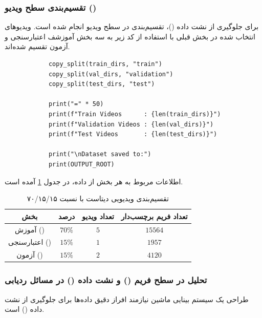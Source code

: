\documentclass{article}
\begin{document}
\subsubsection{تقسیم‌بندی سطح ویدیو ()}

برای جلوگیری از نشت داده ()، تقسیم‌بندی در سطح ویدیو انجام شده است. ویدیوهای انتخاب شده در بخش قبلی با استفاده از کد زیر به سه بخش آموزشف اعتبارسنجی و آزمون تقسیم شده‌اند.

\begin{latin}
	\begin{LTR}
		\begin{verbatim}
			copy_split(train_dirs, "train")
			copy_split(val_dirs, "validation")
			copy_split(test_dirs, "test")
			
			print("=" * 50)
			print(f"Train Videos      : {len(train_dirs)}")
			print(f"Validation Videos : {len(val_dirs)}")
			print(f"Test Videos       : {len(test_dirs)}")
			
			print("\nDataset saved to:")
			print(OUTPUT_ROOT)
		\end{verbatim}
	\end{LTR}
\end{latin}

اطلاعات مربوط به هر بخش از داده، در جدول \ref{tab:split} آمده است.

\begin{table}[h!]
	\centering
	\begin{tabular}{cccc}
		\toprule
		\textbf{بخش} & \textbf{درصد} & \textbf{تعداد ویدیو} & \textbf{تعداد فریم برچسب‌دار} \\ 
		\midrule
		آموزش (\lr{Train}) & $70\%$ & $5$ & $15564$ \\
		اعتبارسنجی (\lr{Val}) & $15\%$ & $1$ & $1957$ \\
		آزمون (\lr{Test}) & $15\%$ & $2$ & $4120$ \\
		\bottomrule
	\end{tabular}
	\caption{تقسیم‌بندی ویدیویی دیتاست با نسبت ۷۰/۱۵/۱۵}
	\label{tab:split}
\end{table}

\subsubsection{تحلیل در سطح فریم () و نشت داده () در مسائل ردیابی}
طراحی یک سیستم بینایی ماشین نیازمند افراز دقیق داده‌ها برای جلوگیری از نشت داده () است. 
\end{document}
